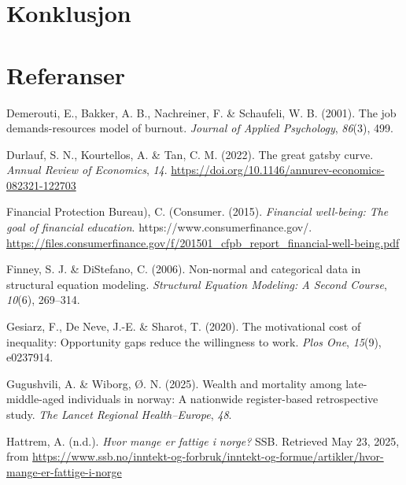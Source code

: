 \documentclass[
  12pt,
  a4paper,
  DIV=11,
  numbers=noendperiod]{scrartcl}
\newlength{\cslhangindent}
\newenvironment{CSLReferences}[2] %
 {\begin{list}{}{%
  \setlength{\itemindent}{0pt}
  \setlength{\leftmargin}{0pt}
  \setlength{\parsep}{0pt}
  \ifodd #1
   \setlength{\leftmargin}{\cslhangindent}
   \setlength{\itemindent}{-1\cslhangindent}
  \fi
  \setlength{\itemsep}{#2\baselineskip}}}
 {\end{list}}
\begin{document}
\newpage

\section{Konklusjon}\label{konklusjon}

\newpage

\section*{Referanser}\label{referanser}

\label{refs}
\begin{CSLReferences}{1}{0}
Demerouti, E., Bakker, A. B., Nachreiner, F. \& Schaufeli, W. B. (2001).
The job demands-resources model of burnout. \emph{Journal of Applied
Psychology}, \emph{86}(3), 499.

Durlauf, S. N., Kourtellos, A. \& Tan, C. M. (2022). The great gatsby
curve. \emph{Annual Review of Economics}, \emph{14}.
\url{https://doi.org/10.1146/annurev-economics-082321-122703}

Financial Protection Bureau), C. (Consumer. (2015). \emph{Financial
well-being: The goal of financial education}.
https://www.consumerfinance.gov/.
\url{https://files.consumerfinance.gov/f/201501_cfpb_report_financial-well-being.pdf}

Finney, S. J. \& DiStefano, C. (2006). Non-normal and categorical data
in structural equation modeling. \emph{Structural Equation Modeling: A
Second Course}, \emph{10}(6), 269--314.

Gesiarz, F., De Neve, J.-E. \& Sharot, T. (2020). The motivational cost
of inequality: Opportunity gaps reduce the willingness to work.
\emph{Plos One}, \emph{15}(9), e0237914.

Gugushvili, A. \& Wiborg, Ø. N. (2025). Wealth and mortality among
late-middle-aged individuals in norway: A nationwide register-based
retrospective study. \emph{The Lancet Regional Health--Europe},
\emph{48}.

Hattrem, A. (n.d.). \emph{Hvor mange er fattige i norge?} SSB. Retrieved
May 23, 2025, from
\url{https://www.ssb.no/inntekt-og-forbruk/inntekt-og-formue/artikler/hvor-mange-er-fattige-i-norge}


\end{CSLReferences}
\end{document}
